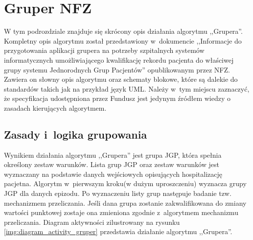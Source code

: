 \section{Gruper NFZ}
\label{sec:gruperNFZ}

W tym podrozdziale znajduje się skrócony opis działania algorytmu ,,Grupera''. Kompletny opis algorytmu został przedstawiony w~dokumencie ,,Informacje do przygotowania aplikacji grupera na potrzeby szpitalnych systemów informatycznych umożliwiającego kwalifikację rekordu pacjenta do właściwej grupy systemu Jednorodnych Grup Pacjentów'' opublikowanym przez NFZ\cite{algorytm_grupera}. Zawiera on słowny opis algorytmu oraz schematy blokowe, które są dalekie do standardów takich jak na przykład język UML. Należy w~tym miejscu zaznaczyć, że specyfikacja udostępniona przez Fundusz jest jedynym źródłem wiedzy o zasadach kierujących algorytmem.

\subsection{Zasady i~logika grupowania}
\label{sec:zasadyLogikaGrupowania}
Wynikiem działania algorytmu ,,Grupera'' jest grupa JGP, która spełnia określony zestaw warunków. Lista grup JGP oraz zestaw warunków jest wyznaczany na podstawie danych wejściowych opisujących hospitalizację pacjetna. Algorytm w~pierwszym kroku(w dużym uproszczeniu) wyznacza grupy JGP dla danych epizodu. Po wyznaczeniu listy grup następuje badanie tzw. mechanizmem przeliczania. Jeśli dana grupa zostanie zakwalifikowana do zmiany wartości punktowej zostaje ona zmieniona zgodnie z~algorytmem mechanizmu przeliczania\cite{algorytm_grupera}. Diagram aktywności zilustrowany na rysunku \ref{img:diagram_activity_gruper} przedstawia działanie algorytmu ,,Grupera''.

